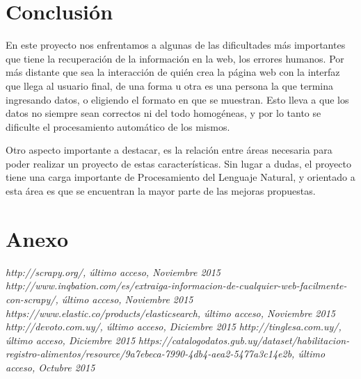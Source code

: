 \documentclass[12pt]{article} %
\begin{document}
\section{Conclusión}

En este proyecto nos enfrentamos a algunas de las dificultades más importantes que tiene la recuperación de la información en la web, los errores humanos. Por más distante que sea la interacción de quién crea la página web con la interfaz que llega al usuario final, de una forma u otra es una persona la que termina ingresando datos, o eligiendo el formato en que se muestran. Esto lleva a que los datos no siempre sean correctos ni del todo homogéneas, y por lo tanto se dificulte el procesamiento automático de los mismos.

Otro aspecto importante a destacar, es la relación entre áreas necesaria para poder realizar un proyecto de estas características. Sin lugar a dudas, el proyecto tiene una carga importante de Procesamiento del Lenguaje Natural, y orientado a esta área es que se encuentran la mayor parte de las mejoras propuestas.

\section{Anexo}


\newpage

\begin{thebibliography}{1}
 \textit{http://scrapy.org/, último acceso, Noviembre 2015}
 \textit{http://www.inqbation.com/es/extraiga-informacion-de-cualquier-web-facilmente-con-scrapy/, último acceso, Noviembre 2015}
 \textit{https://www.elastic.co/products/elasticsearch, último acceso, Noviembre 2015}
 \textit{http://devoto.com.uy/, último acceso, Diciembre 2015}
 \textit{http://tinglesa.com.uy/, último acceso, Diciembre 2015}
 \textit{https://catalogodatos.gub.uy/dataset/habilitacion-registro-alimentos/resource/9a7ebeca-7990-4db4-aea2-5477a3c14e2b, último acceso, Octubre 2015}

\end{thebibliography}

\end{document}
